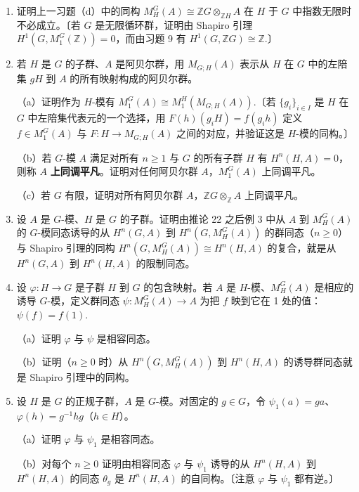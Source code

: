 \begin{enumerate}
\item 证明上一习题（d）中的同构 \(M_H^G(A) \cong \mathbb{Z}G \otimes_{\mathbb{Z}H}A\) 在 \(H\) 于 \(G\) 中指数无限时不必成立。〔若 \(G\) 是无限循环群，证明由 Shapiro 引理 \(H^1(G, M_1^G(\mathbb{Z})) = 0\)，而由习题 9 有 \(H^1(G, \mathbb{Z}G) \cong \mathbb{Z}\).〕

\item 若 \(H\) 是 \(G\) 的子群、\(A\) 是阿贝尔群，用 \(M_{G;H}(A)\) 表示从 \(H\) 在 \(G\) 中的左陪集 \(gH\) 到 \(A\) 的所有映射构成的阿贝尔群。

（a）证明作为 \(H\)-模有 \(M_1^G(A) \cong M_1^H(M_{G;H}(A))\).〔若 \(\{g_i\}_{i \in I}\) 是 \(H\) 在 \(G\) 中左陪集代表元的一个选择，用 \(F(h)(g_iH) = f(g_ih)\) 定义 \(f \in M_1^G(A)\) 与 \(F : H \to M_{G;H}(A)\) 之间的对应，并验证这是 \(H\)-模的同构。〕

（b）若 \(G\)-模 \(A\) 满足对所有 \(n \geq 1\) 与 \(G\) 的所有子群 \(H\) 有 \(H^n(H, A) = 0\)，则称 \(A\) \textbf{上同调平凡}。证明对任何阿贝尔群 \(A\)，\(M_1^G(A)\) 上同调平凡。

（c）若 \(G\) 有限，证明对所有阿贝尔群 \(A\)，\(\mathbb{Z}G \otimes_{\mathbb{Z}}A\) 上同调平凡。

\item 设 \(A\) 是 \(G\)-模、\(H\) 是 \(G\) 的子群。证明由推论 22 之后例 3 中从 \(A\) 到 \(M_H^G(A)\) 的 \(G\)-模同态诱导的从 \(H^n(G, A)\) 到 \(H^n(G, M_H^G(A))\) 的群同态（\(n \geq 0\)）与 Shapiro 引理的同构 \(H^n(G, M_H^G(A)) \cong H^n(H, A)\) 的复合，就是从 \(H^n(G, A)\) 到 \(H^n(H, A)\) 的限制同态。

\item 设 \(\varphi : H \to G\) 是子群 \(H\) 到 \(G\) 的包含映射。若 \(A\) 是 \(H\)-模、\(M_H^G(A)\) 是相应的诱导 \(G\)-模，定义群同态 \(\psi : M_H^G(A) \to A\) 为把 \(f\) 映到它在 1 处的值：\(\psi(f) = f(1)\).

（a）证明 \(\varphi\) 与 \(\psi\) 是相容同态。

（b）证明（\(n \geq 0\) 时）从 \(H^n(G, M_H^G(A))\) 到 \(H^n(H, A)\) 的诱导群同态就是 Shapiro 引理中的同构。

\item 设 \(H\) 是 \(G\) 的正规子群，\(A\) 是 \(G\)-模。对固定的 \(g \in G\)，令 \(\psi_1(a) = ga\)、\(\varphi(h) = g^{-1}hg\)（\(h \in H\)）。

（a）证明 \(\varphi\) 与 \(\psi_1\) 是相容同态。

（b）对每个 \(n \geq 0\) 证明由相容同态 \(\varphi\) 与 \(\psi_1\) 诱导的从 \(H^n(H, A)\) 到 \(H^n(H, A)\) 的同态 \(\theta_g\) 是 \(H^n(H, A)\) 的自同构。〔注意 \(\varphi\) 与 \(\psi_1\) 都有逆。〕


\end{enumerate}
